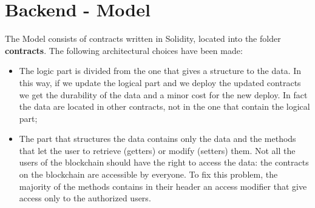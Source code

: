 \section{Backend - Model}
The Model consists of contracts written in Solidity, located into the folder \textbf{contracts}.
The following architectural choices have been made:
\begin{itemize}
	\item The logic part is divided from the one that gives a structure to the data. In this way, if we update the logical part and we deploy the updated contracts we get the durability of the data and a minor cost for the new deploy. In fact the data are located in other contracts, not in the one that contain the logical part;
	 
	\item The part that structures the data contains only the data and the methods that let the user to retrieve (getters) or modify (setters) them. Not all the users of the blockchain should have the right to access the data: the contracts on the blockchain are accessible by everyone. To fix this problem, the majority of the methods contains in their header an access modifier that give access only to the authorized users.
\end{itemize}
